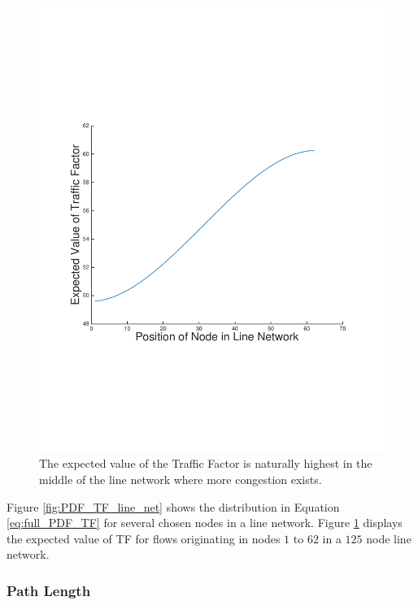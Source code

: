 \begin{figure}
\begin{centering}
    \includegraphics[scale=0.4, clip=true, trim=15mm 65mm 20mm 65mm]{figures/EV_TF_line_net_125.pdf}
    \caption{The expected value of the Traffic Factor is naturally highest in the middle of the line network where more congestion exists.}
    \label{fig:EV_TF_line_net}
\end{centering}
\end{figure}

Figure \ref{fig:PDF_TF_line_net} shows the distribution in Equation \ref{eq:full_PDF_TF} for several chosen nodes in a line network.  Figure \ref{fig:EV_TF_line_net} displays the expected value of TF for flows originating in nodes $1$ to $62$ in a $125$ node line network.  

\subsubsection{Path Length}

